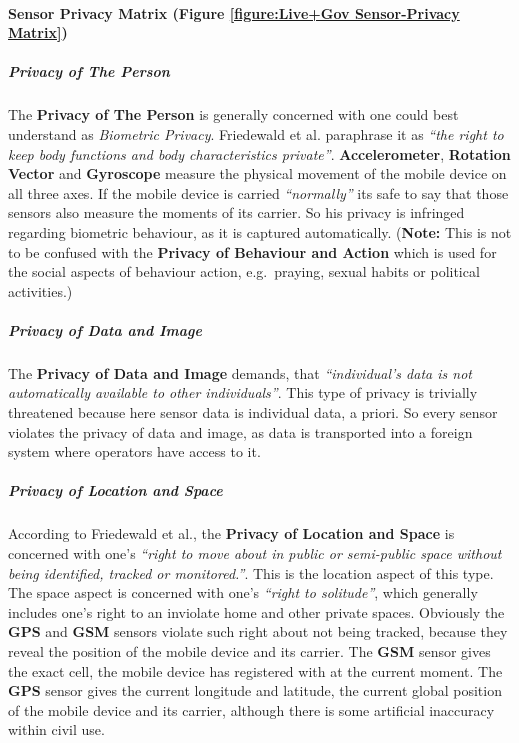 \paragraph{Sensor Privacy Matrix (Figure \ref{figure:Live+Gov Sensor-Privacy Matrix})}



\subparagraph{Privacy of The Person}

The \textbf{Privacy of The Person} is generally concerned with one could
best understand as \emph{Biometric Privacy}. Friedewald et al. paraphrase
it as \emph{``\om the right to keep body functions and body
characteristics \om private''}. \textbf{Accelerometer},
\textbf{Rotation Vector} and \textbf{Gyroscope} measure the physical
movement of the mobile device on all three axes. If the mobile device
is carried \emph{``normally''} its safe to say that those sensors also
measure the moments of its carrier. So his privacy is infringed
regarding biometric behaviour, as it is captured automatically.
(\textbf{Note:} This is not to be confused with the \textbf{Privacy of
Behaviour and Action} which is used for the social aspects of behaviour
action, e.g.~praying, sexual habits or political activities.)

\subparagraph{Privacy of Data and Image}

The \textbf{Privacy of Data and Image} demands, that
\emph{``individual's data is not automatically available to other
individuals''}. This type of privacy is trivially threatened because
here sensor data is individual data, a priori. So every sensor violates
the privacy of data and image, as data is transported into a foreign
system where operators have access to it.

\subparagraph{Privacy of Location and Space}

According to Friedewald et al., the \textbf{Privacy of Location and
Space} is concerned with one's \emph{``right to move about in public or
semi-public space without being identified, tracked or monitored.''}.
This is the location aspect of this type. The space aspect is concerned
with one's \emph{``right to solitude''}, which generally includes one's
right to an inviolate home and other private spaces. Obviously the
\textbf{GPS} and \textbf{GSM} sensors violate such right about not being
tracked, because they reveal the position of the mobile device and its
carrier. The \textbf{GSM} sensor gives the exact cell, the mobile device
has registered with at the current moment. The \textbf{GPS} sensor gives
the current longitude and latitude, the current global position of the
mobile device and its carrier, although there is some artificial
inaccuracy within civil use.

